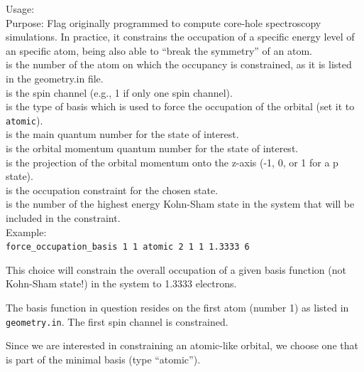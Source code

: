 {
  \noindent
  Usage:       
     \\[1.0ex]
  Purpose: Flag originally programmed to compute core-hole spectroscopy simulations. 
           In practice, it constrains the occupation of a specific
           energy level of an specific atom, being also able to ``break the symmetry'' 
           of an atom.  \\[1.0ex]
   is the number of the atom on which the occupancy is constrained, as it is listed in the
                   geometry.in file.\\[1.0ex] 
   is the spin channel (e.g., 1 if only one spin channel). \\[1.0ex] 
   is the type of basis which is used to force
                       the occupation of the orbital (set it to \texttt{atomic}). \\[1.0ex]
   is the main quantum number for
                    the state of interest.\\[1.0ex]
   is the orbital momentum quantum number for the state of interest.\\[1.0ex]
   is the projection of the orbital momentum onto the z-axis (-1, 0, or 1 for a p state).\\[1.0ex]
   is the occupation constraint for the chosen state.\\[1.0ex]
   is the number of the highest energy Kohn-Sham state 
                    in the system that will be included in the constraint.\\[1.0ex]  
}
  Example: \\[1.0ex]
  \texttt{force\_occupation\_basis 1 1 atomic 2 1 1 1.3333 6}

  This choice will constrain the overall occupation of a given basis function 
  (not Kohn-Sham state!) in the system to 1.3333 electrons.

  The basis function in question resides on the first atom (number 1)
  as listed in \texttt{geometry.in}. The first spin channel is
  constrained. 

  Since we are interested in constraining an atomic-like orbital, we
  choose one that is part of the minimal basis (type ``atomic''). 

